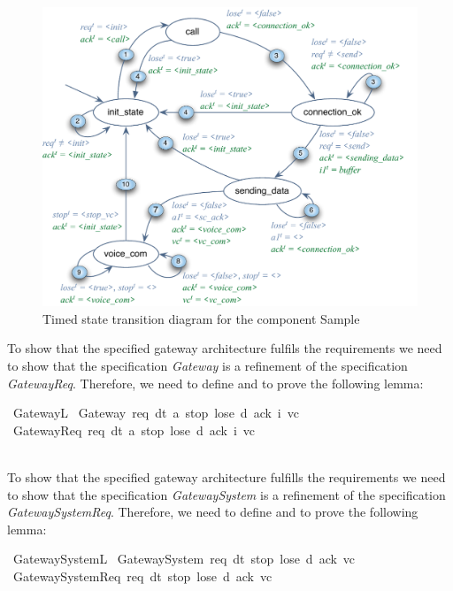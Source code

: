   
 \begin{figure}[h]
  \begin{center}
    \includegraphics[scale=0.6]{fig/gatewayTSTD.pdf}
  \end{center}
  \caption{Timed state transition diagram for the component Sample}
  \label{fig:gateway_std}
\end{figure} 


  To show that the specified gateway architecture fulfils the requirements we need to show that
the specification \emph{Gateway} is a refinement of the specification \emph{GatewayReq}. 
Therefore, we need to define and to prove the following lemma:
\\

\begin{isabellebody}%
\isamarkupfalse%
\ Gateway{\isacharunderscore}L{}{\isacharcolon}\isanewline
\ Gateway\ req\ dt\ a\ stop\ lose\ d\ ack\ i\ vc\isanewline
\ {\isasymLongrightarrow} 
\ GatewayReq\ req\ dt\ a\ stop\ lose\ d\ ack\ i\ vc
\end{isabellebody}%

~\\
To show that the specified gateway architecture fulfills the requirements we need to show that
the specification \emph{GatewaySystem} is a refinement of the specification \emph{GatewaySystemReq}. 
Therefore, we need to define and to prove the following lemma:
\\

\begin{isabellebody}%
\isamarkupfalse%
\ GatewaySystem{\isacharunderscore}L{}{\isacharcolon}\isanewline
\ GatewaySystem\ req\ dt\ stop\ lose\ d\ ack\ vc\isanewline
\ {\isasymLongrightarrow} 
\ GatewaySystemReq\ req\ dt\ stop\ lose\ d\ ack\ vc\isanewline
\end{isabellebody}%
  
%
